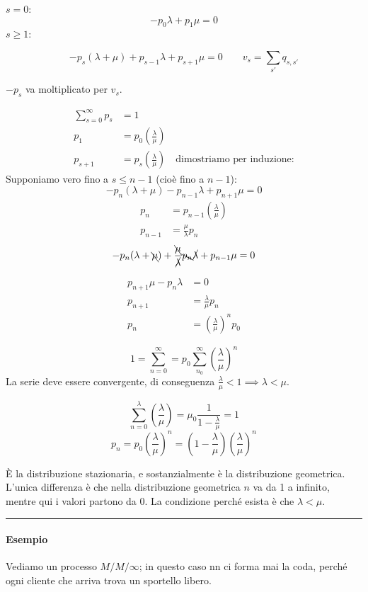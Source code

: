 \documentclass[a4paper,12pt]{book}
\begin{document}
$ s = 0 $:
$$ -p_0 \lambda + p_1 \mu = 0 $$
$ s \ge 1 $:

$$ -p_s (\lambda + \mu) + p_{s-1}\lambda + p_{s+1}\mu = 0 \qquad v_s = \sum_{s'} q_{s,s'} $$ 

$ -p_s $ va moltiplicato per $ v_s $. 

\begin{align*} 
	\sum_{s=0}^{\infty} p_s & = 1 \\
	p_1 & = p_0(\frac{\lambda}{\mu}) \\
	p_{s+1} & = p_s (\frac{\lambda}{\mu}) \quad \text{dimostriamo per induzione:} 
\end{align*}
Supponiamo vero fino a $ s \le n-1 $ (cioè fino a $ n-1 $):
$$ -p_n (\lambda + \mu) - p_{n-1} \lambda + p_{n+1} \mu = 0 $$
\begin{align*}
	p_n & = p_{n-1}(\frac{\lambda}{\mu}) \\
	p_{n-1} & = \frac{\mu}{\lambda}p_n 
\end{align*}
$$ -p_n(\lambda + \bcancel{\mu}) + \frac{\bcancel{\mu}}{\cancel{\lambda}}\bcancel{p_n}\cancel{\lambda} + p_{n-1}\mu = 0 $$


\begin{align*}
	p_{n+1}\mu - p_n\lambda & = 0 \\
	p_{n+1} & = \frac{\lambda}{\mu}p_n \\
	p_n & = (\frac{\lambda}{\mu})^n p_0
\end{align*}

$$ 1 = \sum_{n=0}^\infty = p_0 \sum_{n_0}^\infty (\frac{\lambda}{\mu})^n $$
	La serie deve essere convergente, di conseguenza $ \frac{\lambda}{\mu} < 1 \implies \lambda < \mu $.

$$ \sum_{n=0}^\lambda (\frac{\lambda}{\mu}) = \mu_0 \frac{1}{1-\frac{\lambda}{\mu}} = 1 $$
$$ p_n = p_0(\frac{\lambda}{\mu})^n = (1 - \frac{\lambda}{\mu})(\frac{\lambda}{\mu})^n $$

È la distribuzione stazionaria, e sostanzialmente è la distribuzione geometrica. 
L'unica differenza è che nella distribuzione geometrica $ n $ va da 1 a infinito, mentre qui i valori partono da 0. La condizione perché esista è che $\lambda < \mu$.

\vspace{1cm}
\hrule 
\vspace{1cm}


\paragraph{Esempio}
Vediamo un processo $ M/M/\infty $; in questo caso nn ci forma mai la coda, perché ogni cliente che arriva trova un sportello libero. 
\end{document}
